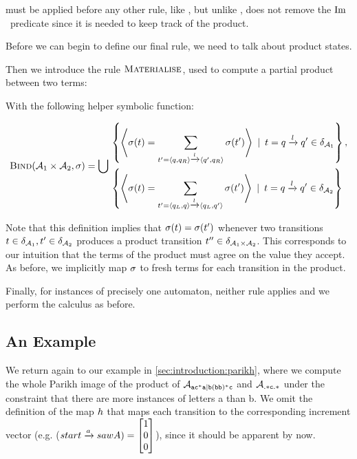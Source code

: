 \documentclass[acmsmall,review,anonymous,screen]{acmart}\settopmatter{printfolios=true,printccs=false,printacmref=true}
\theoremstyle{definition}
\begin{document}
\ExpandM{} must be applied before any other rule, like \Expand{}, but unlike \Expand{}, \ExpandM{} does not remove the $\operatorname{Im}$~predicate since it is needed to keep track of the product.

Before we can begin to define our final rule, we need to talk about product states.

Then we introduce the rule $\textsc{Materialise}$, used to compute a partial product between two terms:

  With the following helper symbolic function:

  $$
  \textsc{Bind}(\mathcal{A}_1 \times \mathcal{A}_2, \operatorname{\sigma}) = \bigcup
  \begin{aligned}
  & \left\{ 
    \left<\operatorname{\sigma}(t)  =  \sum\limits_{t' = \left\langle q, q_R\right\rangle \xrightarrow{l} \left\langle q', q_R\right\rangle} \operatorname{\sigma}(t')\right>
  \:\mid\: t = q \xrightarrow{l} q' \in \delta_{\mathcal{A}_1} \right\} , \\ 
  & \left\{
    \left<\operatorname{\sigma}(t)  =  \sum\limits_{t' = \left\langle q_L, q\right\rangle \xrightarrow{l} \left\langle q_L, q'\right\rangle} \operatorname{\sigma}(t')\right> \:\mid\: t = q \xrightarrow{l} q' \in \delta_{\mathcal{A}_2}
  \right\}
  \end{aligned}
$$

Note that this definition implies that $\operatorname{\sigma}(t) =
\operatorname{\sigma}(t')$ whenever two transitions $t \in
\delta_{\mathcal{A}_1}, t' \in \delta_{\mathcal{A}_2}$
produces a product transition $t'' \in \delta_{\mathcal{A}_1
\times \mathcal{A}_2}$. This corresponds to our intuition that the terms of the
product must agree on the value they accept. As before, we implicitly map
$\operatorname{\sigma}$ to fresh terms for each transition in the product.

Finally, for instances of precisely one automaton, neither rule applies and we
perform the calculus as before.

\subsection{An Example}

We return again to our example in \cref{sec:introduction:parikh}, where we
compute the whole Parikh image of the product of $\mathcal{A}_{\mathtt{ac^*a|b(bb)^*c}}{}$ and
$\mathcal{A}_{\mathtt{.*c.*}}$ under the constraint that there are more instances of
letters a than b. We omit the definition of the map $h$ that maps each
transition to the corresponding increment vector (e.g.
\Map($start \xrightarrow{a} sawA) = \begin{bmatrix}1\\0\\0\end{bmatrix}$),
since it should be apparent by now.
\end{document}
